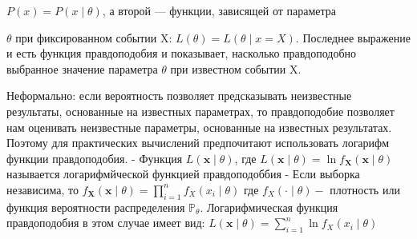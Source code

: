 \documentclass[a4paper, 12pt]{article}
\begin{document}
	$P(x)=P(x\mid \theta )$, а второй — функции, зависящей от параметра 
	
	$\theta$ при фиксированном событии X:
	$L(\theta )=L(\theta \mid x=X)$. Последнее выражение и есть функция правдоподобия и показывает, насколько правдоподобно выбранное значение параметра 
	$\theta$  при известном событии X.
	
	Неформально: если вероятность позволяет предсказывать неизвестные результаты, основанные на известных параметрах, то правдоподобие позволяет нам оценивать неизвестные параметры, основанные на известных результатах.
	Поэтому для практических вычислений предпочитают использовать логарифм функции правдоподобия.
	- Функция $L(\mathbf{x} \mid \theta)$, где
	$L(\mathbf{x} \mid \theta)=\ln f_{\mathbf{X}}(\mathbf{x} \mid \theta)$
	называется логарифмйческой функцией правдоподоббия
	- Если выборка независима, то $f_{\mathbf{X}}(\mathbf{x} \mid \theta)=\prod_{i=1}^{n} f_{X}\left(x_{i} \mid \theta\right)$
	где $f_{X}(\cdot \mid \theta)-$ плотность или функция вероятности распределения $\mathbb{P}_{\theta} .$ Логарифмическая функция правдоподобия в этом случае имеет вид:
	$L(\mathbf{x} \mid \theta)=\sum_{i=1}^{n} \ln f_{X}\left(x_{i} \mid \theta\right)$
\end{document}
